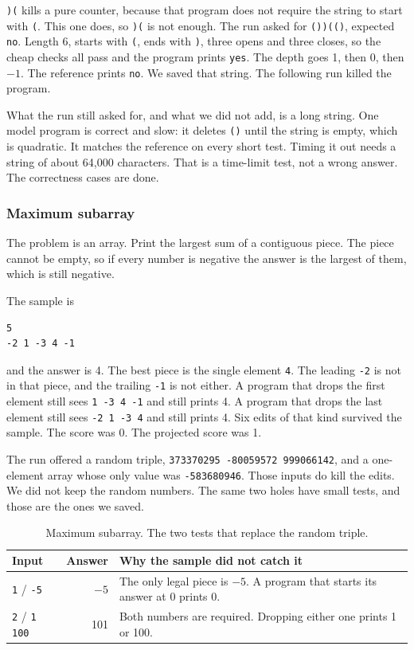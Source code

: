 \documentclass[11pt,a4paper]{article}
\begin{document}
\texttt{)(} kills a pure counter, because that program does not require the string to start with \texttt{(}. This one does, so \texttt{)(} is not enough. The run asked for \texttt{())(()}, expected \texttt{no}. Length 6, starts with \texttt{(}, ends with \texttt{)}, three opens and three closes, so the cheap checks all pass and the program prints \texttt{yes}. The depth goes 1, then 0, then $-1$. The reference prints \texttt{no}. We saved that string. The following run killed the program.

What the run still asked for, and what we did not add, is a long string. One model program is correct and slow: it deletes \texttt{()} until the string is empty, which is quadratic. It matches the reference on every short test. Timing it out needs a string of about 64{,}000 characters. That is a time-limit test, not a wrong answer. The correctness cases are done.

\subsubsection{Maximum subarray}

The problem is an array. Print the largest sum of a contiguous piece. The piece cannot be empty, so if every number is negative the answer is the largest of them, which is still negative.

The sample is

\begin{lstlisting}
5
-2 1 -3 4 -1
\end{lstlisting}

and the answer is 4. The best piece is the single element \texttt{4}. The leading \texttt{-2} is not in that piece, and the trailing \texttt{-1} is not either. A program that drops the first element still sees \texttt{1 -3 4 -1} and still prints 4. A program that drops the last element still sees \texttt{-2 1 -3 4} and still prints 4. Six edits of that kind survived the sample. The score was 0. The projected score was 1.

The run offered a random triple, \texttt{373370295 -80059572 999066142}, and a one-element array whose only value was \texttt{-583680946}. Those inputs do kill the edits. We did not keep the random numbers. The same two holes have small tests, and those are the ones we saved.

\begin{table}[ht]
\centering
\caption{Maximum subarray. The two tests that replace the random triple.}
\label{tab:sub}
{\small
\begin{tabularx}{\textwidth}{@{}l r Y@{}}
\toprule
Input & Answer & Why the sample did not catch it \\
\midrule
\texttt{1} / \texttt{-5} & $-5$ &
The only legal piece is $-5$. A program that starts its answer at 0 prints 0. \\
\texttt{2} / \texttt{1 100} & 101 &
Both numbers are required. Dropping either one prints 1 or 100. \\
\bottomrule
\end{tabularx}
}
\end{table}
\end{document}
